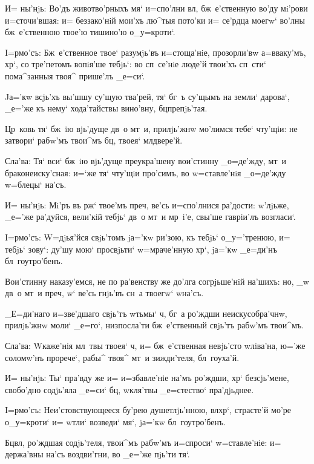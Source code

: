 И= ны'нjь: Во'дъ животво'рныхъ мя` и=спо'лни вл, 
бж~е'ственную во'ду мi'рови и=сточи'вшая: и= беззако'нiй 
мои'хъ лю^тыя пото'ки и= се'рдца моегw` во'лны 
бж~е'ственною твое'ю тишино'ю о_у=кроти`.


I=рмо'съ: Бж~е'ственное твое` разумjь'въ и=стоща'нiе, 
прозорли'вw а=вваку'мъ, хр`, со тре'петомъ вопiя'ше 
тебjь`: во сп~се'нiе люде'й твои'хъ сп~сти` пома^занныя 
твоя^ прише'лъ _е=си`.

Jа='кw всjь'хъ вы'шшу су'щую тва'рей, тя` бг~ъ су'щымъ 
на земли` дарова`, _е='же къ нему` хода'тайствы вино'вну, 
бц препjь'тая.

Цр~ковь тя` бж~iю вjь'дуще дв~о мт~и, прилjь'жнw 
мо'лимся тебе` чту'щiи: не затвори` рабw'мъ твои^мъ 
бц, твоея` мл двере'й.

Сла'ва: Тя` вси` бж~iю вjь'дуще преукра'шену 
вои'стинну _о=де'жду, мт~и браконеиску'сная: и=`же тя` 
чту'щiи про'симъ, во w=ставле'нiя _о=де'жду w=блецы` 
на'съ. 

И= ны'нjь: Мi'ръ въ рж` твое'мъ преч, ве'сь 
и=спо'лнися ра'дости: w'лjьже, _е='же ра'дуйся, 
вели'кiй тебjь` дв~о мт~и мр~i'е, свы'ше гаврiи'лъ 
возгласи`.


I=рмо'съ: W=дjья'йся свjь'томъ jа='кw ри'зою, къ 
тебjь` о_у='тренюю, и= тебjь` зову`: ду'шу мою` 
просвjьти` w=мраче'нную хр`, jа='кw _е=ди'нъ 
бл~гоутро'бенъ.

Вои'стинну наказу'емся, не по ра'венству же до'лга 
согрjьше'нiй на'шихъ: но, _w дв~о мт~и преч, 
w` ве'сь гнjь'въ сн~а твоегw` w\т на'съ.

_Е=ди'наго и=зве'дшаго свjь'тъ w\т тьмы` ч, бг~а 
ро'ждши неискусобра'чнw, прилjь'жнw моли` _е=го`, 
низпосла'ти бж~е'ственный свjь'тъ рабw'мъ твои^мъ.

Сла'ва: W\т каже'нiя мл~твы твоея` ч, и= 
бж~е'ственная невjь'сто w\т лiва'на, ю='же соломw'нъ 
прорече`, рабы^ твоя^ мт~и зижди'теля, бл~гоуха'й.

И= ны'нjь: Ты` пра'вду же и= и=збавле'нiе на'мъ 
ро'ждши, хр` без\ъ сjь'мене, свобо'дно содjь'яла 
_е=си` бц, w\т кля'твы _е=стество` пра'дjьднее.


I=рмо'съ: Неи'стовствующееся бу'рею душетлjь'нною, 
вл хр`, страсте'й мо'ре о_у=кроти` и= w\т тли` 
возведи` мя`, jа='кw бл~гоутро'бенъ.

Бц вл, ро'ждшая содjь'теля, твои^мъ рабw'мъ 
и=спроси` w=ставле'нiе: и= держа'вны на'съ воздви'гни, во 
_е='же пjь'ти тя`.

